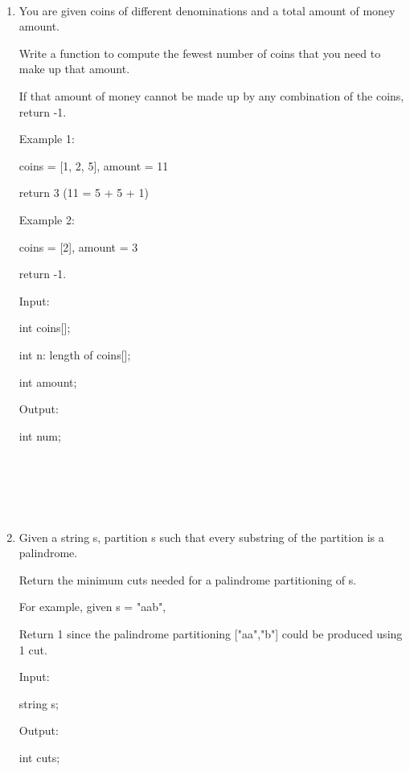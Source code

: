 \documentclass[12pt,a4paper]{article}
\begin{document}
\noindent

\noindent{}
~\\
\begin{enumerate}

\item You are given coins of different denominations and a total amount of money amount.

Write a function to compute the fewest number of coins that you need to make up that amount.

If that amount of money cannot be made up by any combination of the coins, return -1.

Example 1:

coins = [1, 2, 5], amount = 11

return 3 (11 = 5 + 5 + 1)

Example 2:

coins = [2], amount = 3

return -1.

Input:

int coins[];

int n: length of coins[];

int amount;

Output:

int num;


~\\
~\\
~\\
~\\

\item Given a string s, partition s such that every substring of the partition is a palindrome.

Return the minimum cuts needed for a palindrome partitioning of s.

For example, given s = "aab",

Return 1 since the palindrome partitioning ["aa","b"] could be produced using 1 cut.

Input:

string s;

Output:

int cuts;


\end{enumerate}
\end{document}
